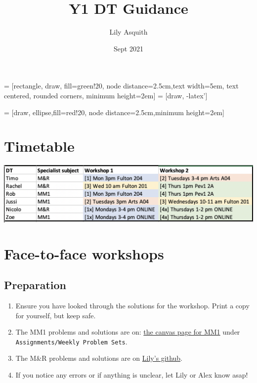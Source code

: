 \documentclass[11.5pt,sans,english]{article}
\title{Y1 DT Guidance}
\author{Lily Asquith}
\date{Sept 2021}
\begin{document}
 = [rectangle, draw, fill=green!20,  node distance=2.5cm,text width=5em, text centered, rounded corners, minimum height=2em]
 = [draw, -latex']

 = [draw, ellipse,fill=red!20, node distance=2.5cm,minimum height=2em]
    
    
    

%
%
%


\section{Timetable}

\includegraphics[scale=0.6]{DT-timetable}

\section{Face-to-face workshops}

\subsection{Preparation}
\begin{enumerate}
\item Ensure you have looked through the solutions for the workshop. Print a copy for yourself, but keep safe.
\item The MM1 problems and solutions are on: \href{ https://canvas.sussex.ac.uk/courses/20370/assignments}{the canvas page for MM1} under \texttt{Assignments/Weekly Problem Sets}.
\item The M\&R problems and solutions are on \href{https://github.com/dorksquith/TeachingFall2021/tree/main/DTs/Solvers}{Lily's github}.
\item If you notice any errors or if anything is unclear, let Lily or Alex know asap!
\end{enumerate}
\end{document}

